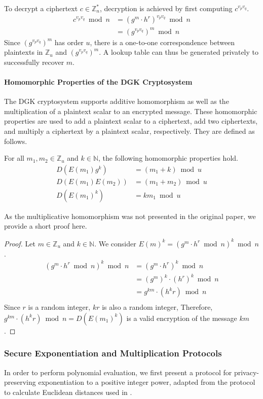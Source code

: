 To decrypt a ciphertext $c \in \mathbb{Z}_n^\ast$, decryption is achieved by first computing $c^{v_pv_q}$.
\begin{align*}
	c^{v_pv_q} \bmod n
	&= (g^m \cdot h^r)^{v_pv_q} \bmod n\\
	&= (g^{v_pv_q})^m \bmod n
\end{align*}
Since $(g^{v_pv_q})^m$ has order $u$, there is a one-to-one correspondence between plaintexts in $\mathbb{Z}_u$ and  $(g^{v_pv_q})^m$. A lookup table can thus be generated privately to successfully recover $m$.

\paragraph{Homomorphic Properties of the DGK Cryptosystem}
The DGK cryptosystem supports additive homomorphism as well as the multiplication of a plaintext scalar to an encrypted message. These homomorphic properties are used to add a plaintext scalar to a ciphertext, add two ciphertexts, and multiply a ciphertext by a plaintext scalar, respectively. They are defined as follows.

For all $m_1,m_2 \in \mathbb{Z}_u$ and $k\in \mathbb{N}$, the following homomorphic properties hold.
\begin{align*}
    D(E(m_1)g^k) &=(m_1+k)\bmod u\\
    D(E(m_1)E(m_2)) &=(m_1+m_2)\bmod u\\
    D(E(m_1)^k) &= km_1\bmod u
\end{align*}

As the multiplicative homomorphism was not presented in the original paper, we provide a short proof here.
\begin{proof}
  Let $m \in \mathbb{Z}_u$ and $k\in \mathbb{N}$.
  We consider $E(m)^k = (g^m \cdot h^r \bmod{n})^k\bmod n$.
  \begin{align*}
    (g^m \cdot h^r \bmod{n})^k \bmod n
    &= (g^m \cdot h^r)^k \bmod{n}\\
    &= (g^m)^k \cdot (h^r)^k \bmod{n}\\
    &= g^{km} \cdot (h^kr) \bmod{n}\\
  \end{align*}
  Since $r$ is a random integer, $kr$ is also a random integer, Therefore, $g^{km} \cdot (h^kr) \bmod{n} = D(E(m_1)^k)$ is a valid encryption of the message $km$.
\end{proof}


\subsubsection{Secure Exponentiation and Multiplication Protocols}
\label{ssec:exponentiationprotocol}
In order to perform polynomial evaluation, we first present a protocol for privacy-preserving exponentiation to a positive integer power, adapted from the protocol to calculate Euclidean distances used in \cite{hutchison_privacy-preserving_2009}.

